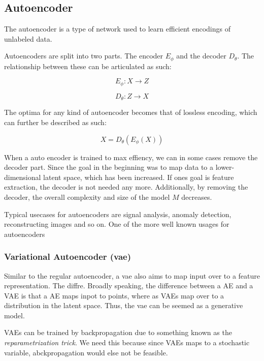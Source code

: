 \subsection{Autoencoder}

The autoencoder is a type of network used to learn efficient encodings of unlabeled data. 

Autoencoders are split into two parts. The encoder $E_\phi$ and the decoder $D_\theta$. The relationship between these can be articulated as such: 

\begin{equation}
E_\phi: X \rightarrow Z 
\end{equation}

\begin{equation}
D_\theta: Z \rightarrow X
\end{equation}

The optima for any kind of autoencoder becomes that of lossless encoding, which can further be described as such:

\begin{equation}
    X = D_\theta(E_\phi(X))
\end{equation}

When a auto encoder is trained to max effiency, we can in some cases remove the decoder part. Since the goal in the beginning was to map data to a lower-dimensional latent space, which has been increased. If ones goal is feature extraction, the decoder is not needed any more. Additionally, by removing the decoder, the overall complexity and size of the model $M$ decreases.


Typical usecases for autoencoders are signal analysis, anomaly detection, reconstructing images and so on. 
One of the more well known usages for autoencoders

\subsubsection{Variational Autoencoder (\acrshort{vae})}

Similar to the regular autoencoder, a \acrfull{vae} also aims to map input over to a feature representation. The diffre. Broadly speaking, the difference between a \acrshort{AE} and a \acrshort{VAE} is that a AE maps inpot to points, where as VAEs map over to a distribution in the latent space. Thus, the \acrlong{vae} can be seemed as a generative model.




VAEs can be trained by backpropagation due to something known as the \textit{reparametrization trick}. We need this because since VAEs maps to a stochastic variable, abckpropagation would else not be feasible.

